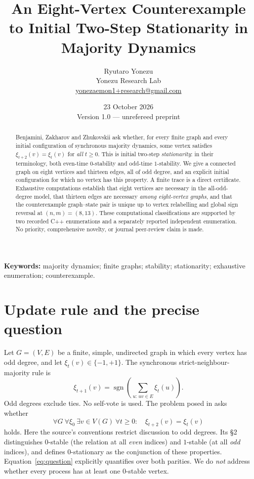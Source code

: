 \documentclass[11pt,a4paper]{article}
\title{\bfseries An Eight-Vertex Counterexample to Initial Two-Step Stationarity in Majority Dynamics}
\author{Ryutaro Yonezu\\\small Yonezu Research Lab\\\small \href{mailto:yonezaemon1+research@gmail.com}{yonezaemon1+research@gmail.com}}
\date{23 October 2026\\\small Version 1.0 --- unrefereed preprint}
\begin{document}
\maketitle
\vspace{-1em}
\begin{abstract}
Benjamini, Zakharov and Zhukovskii ask whether, for every finite graph and every initial configuration of synchronous majority dynamics, some vertex satisfies $\xi_{t+2}(v)=\xi_t(v)$ for \emph{all} $t\geq0$. This is initial two-step \emph{stationarity}: in their terminology, both even-time $0$-stability and odd-time $1$-stability. We give a connected graph on eight vertices and thirteen edges, all of odd degree, and an explicit initial configuration for which no vertex has this property. A finite trace is a direct certificate. Exhaustive computations establish that eight vertices are necessary in the all-odd-degree model, that thirteen edges are necessary \emph{among eight-vertex graphs}, and that the counterexample graph--state pair is unique up to vertex relabelling and global sign reversal at $(n,m)=(8,13)$. These computational classifications are supported by two recorded C++ enumerations and a separately reported independent enumeration. No priority, comprehensive novelty, or journal peer-review claim is made.
\end{abstract}
\noindent\textbf{Keywords:} majority dynamics; finite graphs; stability; stationarity; exhaustive enumeration; counterexample.

\section{Update rule and the precise question}
Let $G=(V,E)$ be a finite, simple, undirected graph in which every vertex has odd degree, and let $\xi_t(v)\in\{-1,+1\}$. The synchronous strict-neighbour-majority rule is
\begin{equation}\label{eq:rule}
\xi_{t+1}(v)=\operatorname{sgn}\!\left(\sum_{u:\,uv\in E}\xi_t(u)\right).
\end{equation}
Odd degrees exclude ties. No self-vote is used. The problem posed in \cite[\S6, `Stabilisation time']{BZZ} asks whether
\begin{equation}\label{eq:question}
\forall G\ \forall \xi_0\ \exists v\in V(G)\ \forall t\geq0:\quad \xi_{t+2}(v)=\xi_t(v)
\end{equation}
holds. Here the source's conventions restrict discussion to odd degrees. Its \S2 distinguishes $0$-stable (the relation at all \emph{even} indices) and $1$-stable (at all \emph{odd} indices), and defines $0$-stationary as the conjunction of these properties. Equation~\eqref{eq:question} explicitly quantifies over both parities. We do \emph{not} address whether every process has at least one $0$-stable vertex.
\end{document}
